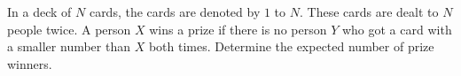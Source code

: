 In a deck of $N$ cards, the cards are denoted by $1$ to $N$. These cards are dealt to $N$ people twice. A person $X$ wins a prize if there is no person $Y$ who got a card with a smaller number than $X$ both times. Determine the expected number of prize winners.